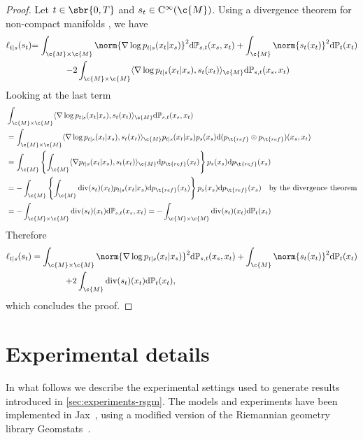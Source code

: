 \begin{proof}
	Let \(t \in \sbr{0,T}\) and \(s_t \in \mathrm{C}^\infty(\c{M})\).
	Using a divergence theorem for non-compact manifolds \cite[see][p.2]{gaffney1954}, we have \begin{align} \ell_{t|s}(s_t) &{= \int_{\c{M} \times \c{M}} \norm{\nabla \log p_{t|s}(x_t|x_s)}^2 \mathrm{d} \bb{P}_{s,t}(x_s,x_t) + \int_\c{M} \norm{s_t(x_t)}^2 \mathrm{d} \bb{P}_{t}(x_t)} \\ & \qquad \qquad {- 2 \int_{\c{M} \times \c{M}} \langle \nabla \log p_{t|s}(x_t|x_s), s_t(x_t) \rangle_\c{M} \mathrm{d} \bb{P}_{s,t}(x_s,x_t)} \end{align} Looking at the last term \begin{align} &\int_{\c{M} \times \c{M}} \langle \nabla \log p_{t|s}(x_t|x_s), s_t(x_t) \rangle_\c{M} \mathrm{d} \bb{P}_{s,t}(x_s,x_t)\\ &= \int_{\c{M} \times \c{M}} \langle \nabla \log p_{t|s}(x_t|x_s), s_t(x_t) \rangle_\c{M} p_{t|s}(x_t|x_s)p_s(x_s) \mathrm{d} (p_{\t{ref}} \otimes p_{\t{ref}}) (x_s, x_t) \\ &=\int_{\c{M} } \left\{\int_\c{M} \langle \nabla p_{t|s}(x_t|x_s), s_t(x_t) \rangle_\c{M} \mathrm{d} p_{\t{ref}}(x_t)\right\} p_s(x_s) \mathrm{d} p_{\t{ref}}(x_s) \\ &= -\int_{\c{M} } \left\{\int_\c{M} \mathrm{div}(s_t)(x_t)p_{t|s}(x_t|x_s) \mathrm{d} p_{\t{ref}}(x_t)\right\} p_s(x_s) \mathrm{d} p_{\t{ref}}(x_s) \quad \text{by the divergence theorem} \\ &=- \int_{\c{M} \times \c{M}} \mathrm{div}(s_t)(x_t)\mathrm{d} \bb{P}_{s,t}(x_s,x_t) =- \int_{\c{M} \times \c{M}} \mathrm{div}(s_t)(x_t)\mathrm{d} \bb{P}_{t}(x_t) \end{align} Therefore \begin{align} \ell_{t|s}(s_t) &={\int_{\c{M} \times \c{M}} \norm{\nabla \log p_{t|s}(x_t|x_s)}^2 \mathrm{d} \bb{P}_{s,t}(x_s,x_t) + \int_\c{M} \norm{s_t(x_t)}^2 \mathrm{d} \bb{P}_{t}(x_t)} \\ & \qquad \qquad { +2 \int_{\c{M}} \mathrm{div}(s_t)(x_t)\mathrm{d} \bb{P}_{t}(x_t)} , \end{align} which concludes the proof.
\end{proof}

\section{Experimental details}
\label{sec:exp_detail_rsgm}

In what follows we describe the experimental settings used to generate results introduced in \cref{sec:experiments-rsgm}.
The models and experiments have been implemented in Jax~\parencite{jax2018github}, using a modified version of the Riemannian geometry library Geomstats~\parencite{geomstats2020}.

